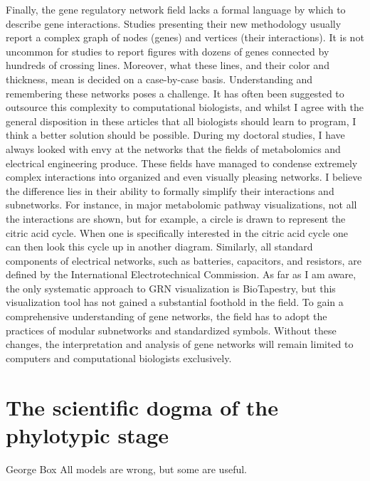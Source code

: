 Finally, the gene regulatory network field lacks a formal language by which to describe gene interactions\cite{Lazebnik2002}. Studies presenting their new methodology usually report a complex graph of nodes (genes) and vertices (their interactions)\cite{Xu_2020,Aibar_2017,Margolin_2006,Glass_2013,Chan_2017,Jiang_2021,Kamimoto_2020,Woodhouse_2018,Rubiolo_2017}. It is not uncommon for studies to report figures with dozens of genes connected by hundreds of crossing lines. Moreover, what these lines, and their color and thickness, mean is decided on a case-by-case basis. Understanding and remembering these networks poses a challenge. It has often been suggested to outsource this complexity to computational biologists\cite{Lazebnik2002,Bray2001,Markowetz2017}, and whilst I agree with the general disposition in these articles that all biologists should learn to program, I think a better solution should be possible. During my doctoral studies, I have always looked with envy at the networks that the fields of metabolomics and electrical engineering produce. These fields have managed to condense extremely complex interactions into organized and even visually pleasing networks. I believe the difference lies in their ability to formally simplify their interactions and subnetworks. For instance, in major metabolomic pathway visualizations, not all the interactions are shown, but for example, a circle is drawn to represent the citric acid cycle. When one is specifically interested in the citric acid cycle one can then look this cycle up in another diagram. Similarly, all standard components of electrical networks, such as batteries, capacitors, and resistors, are defined by the International Electrotechnical Commission\cite{IEC}. As far as I am aware, the only systematic approach to GRN visualization is BioTapestry\cite{Longabaugh2011}, but this visualization tool has not gained a substantial foothold in the field. To gain a comprehensive understanding of gene networks, the field has to adopt the practices of modular subnetworks and standardized symbols. Without these changes, the interpretation and analysis of gene networks will remain limited to computers and computational biologists exclusively.

\section{The scientific dogma of the phylotypic stage}

\begin{shadequote}[c]{George Box}
All models are wrong, but some are useful.
\end{shadequote}


